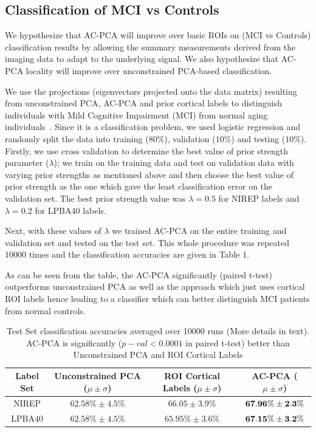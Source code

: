 \documentclass{article}
\begin{document}
\subsection{Classification of MCI vs Controls}

We hypothesize that AC-PCA will improve over basic ROIs on (MCI vs Controls) classification results by allowing the summary
measurements derived from the imaging data to adapt to the underlying signal.  We also hypothesize that AC-PCA locality will improve over
unconstrained PCA-based classification.

We use the projections (eigenvectors projected onto the data matrix) resulting from unconstrained PCA, AC-PCA and prior cortical labels to distinguish individuals with Mild Cognitive Impairment (MCI) from normal aging individuals~\citep{Zhou2011,Chen2010}. 
Since it is a classification problem, we used logistic regression and randomly split the data into training ($80\%$), validation ($10\%$) and testing ($10\%$). Firstly, we use cross validation to determine the best value of prior strength parameter ($\lambda$); we train on the training data and test on validation data with varying prior strengths as mentioned above and then choose the best value of prior strength as the one which gave the least classification error on the validation set.  The best prior strength value was $\lambda =0.5$ for NIREP labels and $\lambda=0.2$ for LPBA40 labels. 

Next, with these values of $\lambda$ we trained AC-PCA on the entire training and validation set and tested on the test set. This whole procedure was repeated 10000 times and the classification accuracies are given in Table 1.

As can be seen from the table, the AC-PCA significantly (paired t-test) outperforms unconstrained PCA as well as the approach which just uses cortical ROI labels hence leading to a classifier which can better distinguish MCI patients from normal controls. 


\begin{table}
\begin{center}
\begin{small}
\begin{tabular}{|c|c|c|c|}
\hline
 Label Set& Unconstrained PCA ($\mu\pm\sigma$) & ROI Cortical Labels ($\mu\pm\sigma$) & AC-PCA ($\mu\pm\sigma$)  \\
\hline
 NIREP& $62.58\% \pm 4.5\%$&$66.05\pm 3.9\%$ &${\bf 67.96\%\pm 2.3\%}$\\
 LPBA40&$62.58\% \pm 4.5\%$&$65.95\%\pm3.6\%$ &${\bf 67.15\%\pm 3.2\%}$\\ 
   \hline
\end{tabular}
\end{small}
\vspace{0.1in}
\caption{Test Set classification accuracies averaged over 10000 runs (More details in text). AC-PCA is significantly ($p-val <0.0001$ in paired t-test) better than Unconstrained PCA and ROI Cortical Labels}
\end{center}
\end{table}
\end{document}
